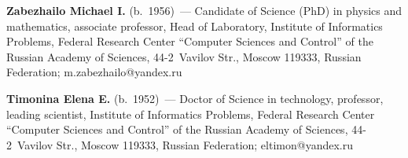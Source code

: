 \vspace*{4pt}

\noindent
\textbf{Zabezhailo Michael I.} (b.\ 1956)~--- Candidate of Science (PhD) in physics and 
mathematics, associate professor, Head of Laboratory, Institute of Informatics Problems, Federal 
Research Center ``Computer Sciences and Control'' of the Russian Academy of Sciences,  
44-2~Vavilov Str., Moscow 119333, Russian Federation; \mbox{m.zabezhailo@yandex.ru} 

\vspace*{4pt}

\noindent
\textbf{Timonina Elena E.} (b.\ 1952)~--- Doctor of Science in technology, professor, leading 
scientist, Institute of Informatics Problems, Federal Research Center ``Computer Sciences and 
Control'' of the Russian Academy of Sciences, 44-2~Vavilov Str., Moscow 119333, Russian 
Federation; \mbox{eltimon@yandex.ru}

\label{end\stat}


\renewcommand{\bibname}{\protect\rm Литература}